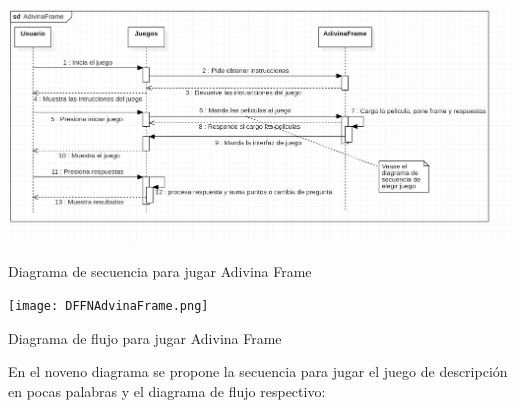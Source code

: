 \documentclass[12pt, oneside, letterpaper]{book}
\begin{document}
\begin{center}
	\centering
		\includegraphics[width=1.3\textwidth]{DSFNAdvinaFrame.png}

	\caption{Diagrama de secuencia para jugar Adivina Frame}
	\label{DSFNAdivinaFrame}
\end{center}

\begin{center}
	\centering
		\texttt{[image: DFFNAdvinaFrame.png]}

	\caption{Diagrama de flujo para jugar Adivina Frame}
	\label{DFFNAdivinaFrame}
\end{center}
\bigskip
\fontsize{14}{18}\selectfont
\par 
En el noveno diagrama se propone la secuencia para jugar el juego de descripción en pocas palabras  y el diagrama de flujo respectivo:
\end{document}
